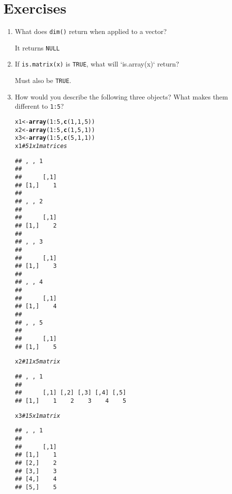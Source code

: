 \documentclass{article}\usepackage[]{graphicx}\usepackage[]{color}
\makeatletter
\newcommand{\hlnum}[1]{\textcolor[rgb]{0.686,0.059,0.569}{#1}}%
\newcommand{\hlcom}[1]{\textcolor[rgb]{0.678,0.584,0.686}{\textit{#1}}}%
\newcommand{\hlopt}[1]{\textcolor[rgb]{0,0,0}{#1}}%
\newcommand{\hlstd}[1]{\textcolor[rgb]{0.345,0.345,0.345}{#1}}%
\newcommand{\hlkwb}[1]{\textcolor[rgb]{0.69,0.353,0.396}{#1}}%
\newcommand{\hlkwd}[1]{\textcolor[rgb]{0.737,0.353,0.396}{\textbf{#1}}}%
\newenvironment{kframe}{%
 \def\at@end@of@kframe{}%
 \ifinner\ifhmode%
  \def\at@end@of@kframe{\end{minipage}}%
  \begin{minipage}{\columnwidth}%
 \fi\fi%
 \def\FrameCommand##1{\hskip\@totalleftmargin \hskip-\fboxsep
 \colorbox{shadecolor}{##1}\hskip-\fboxsep
     \hskip-\linewidth \hskip-\@totalleftmargin \hskip\columnwidth}%
 \MakeFramed {\advance\hsize-\width
   \@totalleftmargin\z@ \linewidth\hsize
   \@setminipage}}%
 {\par\unskip\endMakeFramed%
 \at@end@of@kframe}
\newenvironment{knitrout}{}{} %
\makeatother
\begin{document}
\section{Exercises}

\begin{enumerate}
\item What does \verb`dim()` return when applied to a vector?

It returns \verb`NULL`

\item If \verb`is.matrix(x)` is \verb`TRUE`, what will `is.array(x)` return?

Must also be \verb`TRUE`.

\item How would you describe the following three objects? What makes them different to \verb`1:5`?

\begin{knitrout}
\color{fgcolor}\begin{kframe}
\begin{alltt}
\hlstd{x1} \hlkwb{<-} \hlkwd{array}\hlstd{(}\hlnum{1}\hlopt{:}\hlnum{5}\hlstd{,} \hlkwd{c}\hlstd{(}\hlnum{1}\hlstd{,} \hlnum{1}\hlstd{,} \hlnum{5}\hlstd{))}
\hlstd{x2} \hlkwb{<-} \hlkwd{array}\hlstd{(}\hlnum{1}\hlopt{:}\hlnum{5}\hlstd{,} \hlkwd{c}\hlstd{(}\hlnum{1}\hlstd{,} \hlnum{5}\hlstd{,} \hlnum{1}\hlstd{))}
\hlstd{x3} \hlkwb{<-} \hlkwd{array}\hlstd{(}\hlnum{1}\hlopt{:}\hlnum{5}\hlstd{,} \hlkwd{c}\hlstd{(}\hlnum{5}\hlstd{,} \hlnum{1}\hlstd{,} \hlnum{1}\hlstd{))}
\hlstd{x1} \hlcom{# 5 1x1 matrices}
\end{alltt}
\begin{verbatim}
## , , 1
## 
##      [,1]
## [1,]    1
## 
## , , 2
## 
##      [,1]
## [1,]    2
## 
## , , 3
## 
##      [,1]
## [1,]    3
## 
## , , 4
## 
##      [,1]
## [1,]    4
## 
## , , 5
## 
##      [,1]
## [1,]    5
\end{verbatim}
\begin{alltt}
\hlstd{x2} \hlcom{# 1 1x5 matrix}
\end{alltt}
\begin{verbatim}
## , , 1
## 
##      [,1] [,2] [,3] [,4] [,5]
## [1,]    1    2    3    4    5
\end{verbatim}
\begin{alltt}
\hlstd{x3} \hlcom{# 1 5x1 matrix}
\end{alltt}
\begin{verbatim}
## , , 1
## 
##      [,1]
## [1,]    1
## [2,]    2
## [3,]    3
## [4,]    4
## [5,]    5
\end{verbatim}
\end{kframe}
\end{knitrout}
\end{enumerate}
\end{document}
